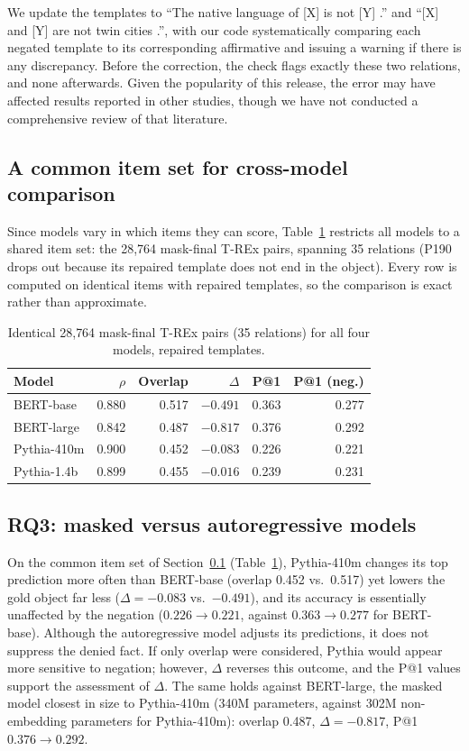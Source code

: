 \documentclass{article}
\begin{document}
We update the templates to ``The native language of [X] is not [Y] .'' and ``[X] and [Y] are not twin cities .'', with our code systematically comparing each negated template to its corresponding affirmative and issuing a warning if there is any discrepancy. Before the correction, the check flags exactly these two relations, and none afterwards. Given the popularity of this release, the error may have affected results reported in other studies, though we have not conducted a comprehensive review of that literature.

\subsection{A common item set for cross-model comparison}
\label{sec:common}

Since models vary in which items they can score, Table~\ref{tab:common} restricts all models to a shared item set: the 28{,}764 mask-final T-REx pairs, spanning 35 relations (P190 drops out because its repaired template does not end in the object). Every row is computed on identical items with repaired templates, so the comparison is exact rather than approximate.

\begin{table}[t]
\centering\small
\caption{Identical 28{,}764 mask-final T-REx pairs (35 relations) for all four models, repaired templates.}
\label{tab:common}
\begin{tabular}{lrrrrr}
\toprule
Model & $\rho$ & Overlap & $\Delta$ & P@1 & P@1 (neg.) \\
\midrule
BERT-base   & 0.880 & 0.517 & $-0.491$ & 0.363 & 0.277 \\
BERT-large  & 0.842 & 0.487 & $-0.817$ & 0.376 & 0.292 \\
Pythia-410m & 0.900 & 0.452 & $-0.083$ & 0.226 & 0.221 \\
Pythia-1.4b & 0.899 & 0.455 & $-0.016$ & 0.239 & 0.231 \\
\bottomrule
\end{tabular}
\end{table}

\subsection{RQ3: masked versus autoregressive models}
\label{sec:results-arch}

On the common item set of Section~\ref{sec:common} (Table~\ref{tab:common}), Pythia-410m changes its
top prediction more often than BERT-base (overlap 0.452 vs.\ 0.517) yet lowers the gold object far less
($\Delta = -0.083$ vs.\ $-0.491$), and its accuracy is essentially unaffected by the negation
($0.226 \rightarrow 0.221$, against $0.363 \rightarrow 0.277$ for BERT-base). Although the autoregressive model adjusts its predictions, it does not suppress the denied fact. If only overlap were considered, Pythia would appear more sensitive to negation; however, $\Delta$ reverses this outcome, and the P@1 values support the assessment of $\Delta$. The same holds against BERT-large, the masked model closest in size to Pythia-410m (340M parameters, against 302M non-embedding parameters for Pythia-410m): overlap 0.487, $\Delta = -0.817$, P@1 $0.376 \rightarrow 0.292$.
\end{document}
